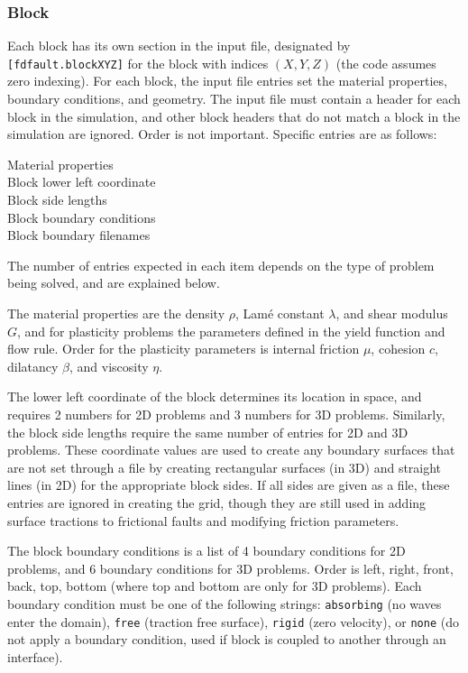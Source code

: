 \documentclass[12pt]{article}   	%
\begin{document}
\subsubsection{Block}

Each block has its own section in the input file, designated by {\tt [fdfault.blockXYZ]} for the block with indices $(X,Y,Z)$ (the code assumes zero indexing). For each block, the input file entries set the material properties, boundary conditions, and geometry. The input file must contain a header for each block in the simulation, and other block headers that do not match a block in the simulation are ignored. Order is not important. Specific entries are as follows:

\vspace{0.1in}
\indent Material properties \\
\indent Block lower left coordinate \\
\indent Block side lengths \\
\indent Block boundary conditions \\
\indent Block boundary filenames

\vspace{0.1in}
\noindent The number of entries expected in each item depends on the type of problem being solved, and are explained below.

The material properties are the density $\rho$, Lam\'{e} constant $\lambda$, and shear modulus $G$, and for plasticity problems the parameters defined in the yield function and flow rule. Order for the plasticity parameters is internal friction $\mu$, cohesion $c$, dilatancy $\beta$, and viscosity $\eta$.

The lower left coordinate of the block determines its location in space, and requires 2 numbers for 2D problems and 3 numbers for 3D problems. Similarly, the block side lengths require the same number of entries for 2D and 3D problems. These coordinate values are used to create any boundary surfaces that are not set through a file by creating rectangular surfaces (in 3D) and straight lines (in 2D) for the appropriate block sides. If all sides are given as a file, these entries are ignored in creating the grid, though they are still used in adding surface tractions to frictional faults and modifying friction parameters.

The block boundary conditions is a list of 4 boundary conditions for 2D problems, and 6 boundary conditions for 3D problems. Order is left, right, front, back, top, bottom (where top and bottom are only for 3D problems). Each boundary condition must be one of the following strings: {\tt absorbing} (no waves enter the domain), {\tt free} (traction free surface), {\tt rigid} (zero velocity), or {\tt none} (do not apply a boundary condition, used if block is coupled to another through an interface).
\end{document}
